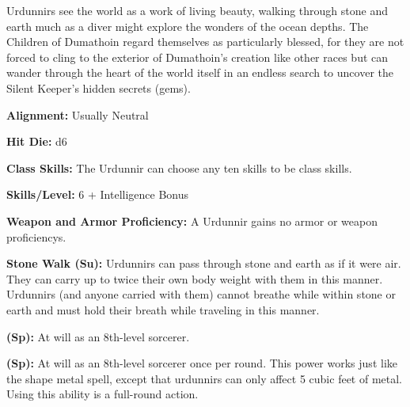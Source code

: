
Urdunnirs see the world as a work of living beauty, walking through stone and earth much as a diver might explore the wonders of the ocean depths. The Children of Dumathoin regard themselves as particularly blessed, for they are not forced to cling to the exterior of Dumathoin’s creation like other races but can wander through the heart of the world itself in an endless search to uncover the Silent Keeper’s hidden secrets (gems).

\textbf{Alignment:} Usually Neutral

\textbf{Hit Die:} d6

\textbf{Class Skills:} The Urdunnir can choose any ten skills to be class skills.

\textbf{Skills/Level:} 6 + Intelligence Bonus

\poorbab{}
\poorfor{}
\poorref{}
\goodwil{}

\begin{classtable}
\end{classtable}

\classfeatures

\textbf{Weapon and Armor Proficiency:} A Urdunnir gains no armor or weapon proficiencys.

\textbf{Stone Walk (Su):} Urdunnirs can pass through stone and earth as if it were air. They can carry up to twice their own body weight with them in this manner. Urdunnirs (and anyone carried with them) cannot breathe while within stone or earth and must hold their breath while traveling in this manner.

\textbf{ (Sp):} At will as an 8th-level sorcerer.

\textbf{ (Sp):} At will as an 8th-level sorcerer once per round. This power works just like the shape metal spell, except that urdunnirs can only affect 5 cubic feet of metal. Using this ability is a full-round action.